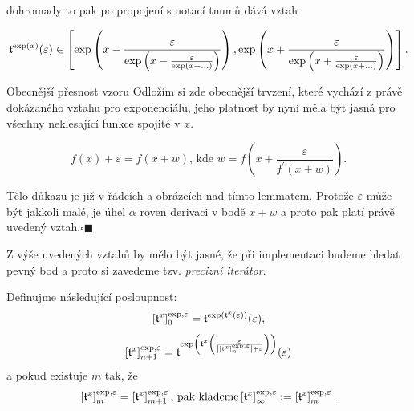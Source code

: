 dohromady to pak po propojení s notací tnumů dává vztah

\begin{equation}\label{rekpresexp3}
\mathfrak{t}^{\mathrm{exp}(x)}(\varepsilon)\in\left[
\mathrm{exp}\left(x-\frac{\varepsilon}{\mathrm{exp}\left(x-\frac{\varepsilon}{\mathrm{exp}(x-\ldots)}\right)}\right), \mathrm{exp}\left(x+\frac{\varepsilon}{\mathrm{exp}\left(x+\frac{\varepsilon}{\mathrm{exp}(x+\ldots)}\right)}\right)\right].
\end{equation}

\begin{myremarkbez}{Obecnější přesnost vzoru}
Odložím si zde obecnější trvzení, které vychází z právě dokázaného vztahu pro exponenciálu, jeho platnost by nyní měla být jasná pro všechny neklesající funkce spojité v $x$.
\begin{lemma}\label{lem:presprom}
\begin{equation}\label{eq:presprom}
f(x)+\varepsilon=f(x+w)\text{,~kde~}w=f\left(x+\frac{\varepsilon}{f^{'}(x+w)}\right).
\end{equation}
\begin{proofscernou}
Tělo důkazu je již v řádcích a obrázcích nad tímto lemmatem. Protože $\varepsilon$ může být jakkoli malé, je úhel $\alpha$ roven derivaci v bodě $x+w$ a proto pak platí právě uvedený vztah.\hfill$\square\blacksquare$
\end{proofscernou}
\end{lemma}
\end{myremarkbez}

Z výše uvedených vztahů by mělo být jasné, že při implementaci budeme hledat pevný bod a proto si zavedeme tzv. \textit{precizní iterátor}.

\begin{definition}
Definujme následující posloupnost:
\begin{equation}
\left[\mathfrak{t}^{x}\right]_0^{\mathrm{exp},\varepsilon}=\mathfrak{t}^{\mathrm{exp}(\mathfrak{t}^{x}(\varepsilon))}(\varepsilon),
\end{equation}
\begin{equation}
\left[ \mathfrak{t}^{x}\right]_{n+1}^{\mathrm{exp},\varepsilon}=\mathfrak{t}^{\mathrm{exp}\left(\mathfrak{t}^{x}\left(\frac{\varepsilon}{\left|\left[ \mathfrak{t}^{x}\right]_n^{\mathrm{exp},\varepsilon}\right|+\varepsilon}\right)\right)}(\varepsilon)
\end{equation}
a pokud existuje $m$ tak, že
\begin{equation}
\left[\mathfrak{t}^{x}\right]_m^{\mathrm{exp},\varepsilon} = \left[\mathfrak{t}^{x}\right]_{m+1}^{\mathrm{exp},\varepsilon}\text{, pak klademe}\left[\mathfrak{t}^{x} \right]_\infty^{\mathrm{exp},\varepsilon} := \left[\mathfrak{t}^{x}\right]_m^{\mathrm{exp},\varepsilon}.
\end{equation}
\end{definition}

